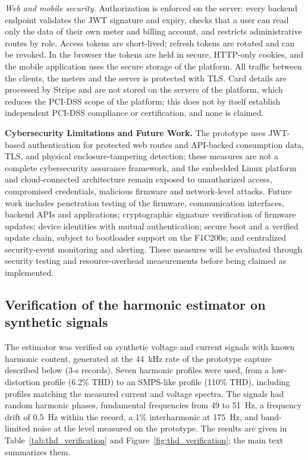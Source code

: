 \textit{Web and mobile security.} Authorization is enforced on the server: every backend endpoint validates the JWT signature and expiry, checks that a user can read only the data of their own meter and billing account, and restricts administrative routes by role. Access tokens are short-lived; refresh tokens are rotated and can be revoked. In the browser the tokens are held in secure, HTTP-only cookies, and the mobile application uses the secure storage of the platform. All traffic between the clients, the meters and the server is protected with TLS. Card details are processed by Stripe and are not stored on the servers of the platform, which reduces the PCI-DSS scope of the platform; this does not by itself establish independent PCI-DSS compliance or certification, and none is claimed.

\textbf{Cybersecurity Limitations and Future Work.} The prototype uses JWT-based authentication for protected web routes and API-backed consumption data, TLS, and physical enclosure-tampering detection; these measures are not a complete cybersecurity assurance framework, and the embedded Linux platform and cloud-connected architecture remain exposed to unauthorized access, compromised credentials, malicious firmware and network-level attacks. Future work includes penetration testing of the firmware, communication interfaces, backend APIs and applications; cryptographic signature verification of firmware updates; device identities with mutual authentication; secure boot and a verified update chain, subject to bootloader support on the F1C200s; and centralized security-event monitoring and alerting. These measures will be evaluated through security testing and resource-overhead measurements before being claimed as implemented.

\subsection*{Verification of the harmonic estimator on synthetic signals}

The estimator was verified on synthetic voltage and current signals with known harmonic content, generated at the 44~kHz rate of the prototype capture described below (3-s records). Seven harmonic profiles were used, from a low-distortion profile (6.2\% THD) to an SMPS-like profile (110\% THD), including profiles matching the measured current and voltage spectra. The signals had random harmonic phases, fundamental frequencies from 49 to 51~Hz, a frequency drift of 0.5~Hz within the record, a 1\% interharmonic at 175~Hz, and band-limited noise at the level measured on the prototype. The results are given in Table~\ref{tab:thd_verification} and Figure~\ref{fig:thd_verification}; the main text summarizes them.

